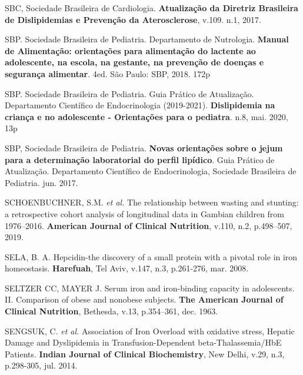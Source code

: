 \bigbreak

\noindent SBC, Sociedade Brasileira de Cardiologia.  \textbf{Atualização da Diretriz Brasileira de Dislipidemias e Prevenção da Aterosclerose}, v.109. n.1, 2017.

\bigbreak

\noindent SBP. Sociedade Brasileira de Pediatria. Departamento de Nutrologia. \textbf{Manual de Alimentação: orientações para alimentação do lactente ao adolescente, na escola, na gestante, na prevenção de doenças e segurança alimentar}. 4ed. São Paulo: SBP, 2018. 172p

\bigbreak

\noindent SBP. Sociedade Brasileira de Pediatria. Guia Prático de Atualização. Departamento Científico de Endocrinologia (2019-2021). \textbf{Dislipidemia na criança e no adolescente - Orientações para o pediatra}. n.8, mai. 2020, 13p

\bigbreak

\noindent SBP, Sociedade Brasileira de Pediatria. \textbf{Novas orientações sobre o jejum para a determinação laboratorial do perfil lipídico}. Guia Prático de Atualização. Departamento Científico de Endocrinologia, Sociedade Brasileira de Pediatria. jun. 2017.

\bigbreak

\noindent SCHOENBUCHNER, S.M. \textit{et al.} The relationship between wasting and stunting: a retrospective cohort analysis of longitudinal data in Gambian children from 1976–2016. \textbf{American Journal of Clinical Nutrition}, v.110, n.2, p.498–507, 2019.

\bigbreak

\noindent SELA, B. A. Hepcidin-the discovery of a small protein with a pivotal role in iron homeostasis. \textbf{Harefuah}, Tel Aviv, v.147, n.3, p.261-276, mar. 2008.

\bigbreak

\noindent SELTZER CC, MAYER J. Serum iron and iron-binding capacity in adolescents. II. Comparison of obese and nonobese subjects. \textbf{The American Journal of Clinical Nutrition}, Bethesda, v.13, p.354–361, dec. 1963. 

\bigbreak

\noindent SENGSUK, C. \textit{et al.} Association of Iron Overload with oxidative stress, Hepatic Damage and Dyslipidemia in Transfusion-Dependent beta-Thalassemia/HbE Patients. \textbf{Indian Journal of Clinical Biochemistry}, New Delhi, v.29, n.3, p.298-305, jul. 2014.

\bigbreak

